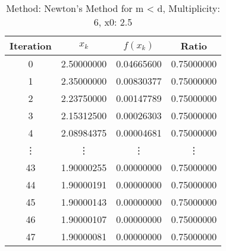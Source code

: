 \begin{table}
\centering
\caption{Method: Newton's Method for m < d, Multiplicity: 6, x0: 2.5}
\label{tab:table_Newton's_Method_for_m_<_d_6_2_5}
\begin{tabular}{c c c c}
\toprule
Iteration &      $x_k$ &   $f(x_k)$ &      Ratio \\
\midrule
        0 & 2.50000000 & 0.04665600 & 0.75000000 \\
        1 & 2.35000000 & 0.00830377 & 0.75000000 \\
        2 & 2.23750000 & 0.00147789 & 0.75000000 \\
        3 & 2.15312500 & 0.00026303 & 0.75000000 \\
        4 & 2.08984375 & 0.00004681 & 0.75000000 \\
   \vdots &     \vdots &     \vdots &     \vdots \\
       43 & 1.90000255 & 0.00000000 & 0.75000000 \\
       44 & 1.90000191 & 0.00000000 & 0.75000000 \\
       45 & 1.90000143 & 0.00000000 & 0.75000000 \\
       46 & 1.90000107 & 0.00000000 & 0.75000000 \\
       47 & 1.90000081 & 0.00000000 & 0.75000000 \\
\bottomrule
\end{tabular}
\end{table}
